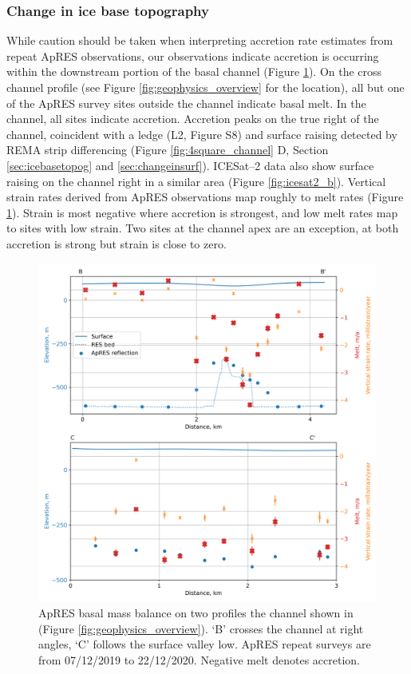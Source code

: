 \subsubsection{Change in ice base topography} \label{sec:changeinbase}

While caution should be taken when interpreting accretion rate estimates from repeat ApRES observations, our observations indicate accretion is occurring within the downstream portion of the basal channel (Figure \ref{fig:APRES_melt}). 
On the cross channel profile (see Figure \ref{fig:geophysics_overview} for the location), all but one of the ApRES survey sites outside the channel indicate basal melt. In the channel, all sites indicate accretion. Accretion peaks on the true right of the channel, coincident with a ledge (L2, Figure S8) and surface raising detected by REMA strip differencing (Figure \ref{fig:4square_channel} D, Section \ref{sec:icebasetopog} and \ref{sec:changeinsurf}). ICESat--2 data also show surface raising on the channel right in a similar area (Figure \ref{fig:icesat2_b}). 
Vertical strain rates derived from ApRES observations map roughly to melt rates (Figure \ref{fig:APRES_melt}). Strain is most negative where accretion is strongest, and low melt rates map to sites with low strain. Two sites at the channel apex are an exception, at both accretion is strong but strain is close to zero.

\begin{figure}[!ht]
\centering
\includegraphics[width=1\textwidth]{chapters/2/APRES_melt.png}
\caption[ApRES results]{ApRES basal mass balance on two profiles the channel shown in (Figure \ref{fig:geophysics_overview}). `B' crosses the channel at right angles, `C' follows the surface valley low.  ApRES repeat surveys are from 07/12/2019 to 22/12/2020. Negative melt denotes accretion.   }
\label{fig:APRES_melt}
\end{figure}  

